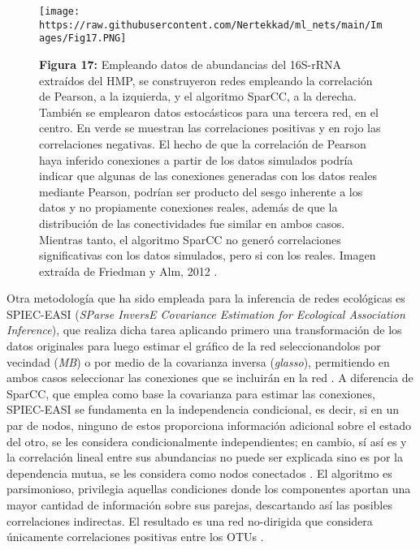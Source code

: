 \documentclass[
]{book}
\begin{document}
\begin{figure}
\centering
\texttt{[image: https://raw.githubusercontent.com/Nertekkad/ml\_nets/main/Images/Fig17.PNG]}
\caption{\textbf{Figura 17:} Empleando datos de abundancias del 16S-rRNA extraídos del HMP, se construyeron redes empleando la correlación de Pearson, a la izquierda, y el algoritmo SparCC, a la derecha. También se emplearon datos estocásticos para una tercera red, en el centro. En verde se muestran las correlaciones positivas y en rojo las correlaciones negativas. El hecho de que la correlación de Pearson haya inferido conexiones a partir de los datos simulados podría indicar que algunas de las conexiones generadas con los datos reales mediante Pearson, podrían ser producto del sesgo inherente a los datos y no propiamente conexiones reales, además de que la distribución de las conectividades fue similar en ambos casos. Mientras tanto, el algoritmo SparCC no generó correlaciones significativas con los datos simulados, pero si con los reales. Imagen extraída de Friedman y Alm, 2012 \citep{friedman2012inferring}.}
\end{figure}

Otra metodología que ha sido empleada para la inferencia de redes ecológicas es SPIEC-EASI (\emph{SParse InversE Covariance Estimation for Ecological Association Inference}), que realiza dicha tarea aplicando primero una transformación de los datos originales para luego estimar el gráfico de la red seleccionandolos por vecindad (\emph{MB}) o por medio de la covarianza inversa (\emph{glasso}), permitiendo en ambos casos seleccionar las conexiones que se incluirán en la red \citep{kurtz2015sparse}. A diferencia de SparCC, que emplea como base la covarianza para estimar las conexiones, SPIEC-EASI se fundamenta en la independencia condicional, es decir, si en un par de nodos, ninguno de estos proporciona información adicional sobre el estado del otro, se les considera condicionalmente independientes; en cambio, sí así es y la correlación lineal entre sus abundancias no puede ser explicada sino es por la dependencia mutua, se les considera como nodos conectados \citep{meinshausen2006high}. El algoritmo es parsimonioso, privilegia aquellas condiciones donde los componentes aportan una mayor cantidad de información sobre sus parejas, descartando así las posibles correlaciones indirectas. El resultado es una red no-dirigida que considera únicamente correlaciones positivas entre los OTUs \citep{kurtz2015sparse}.
\end{document}
